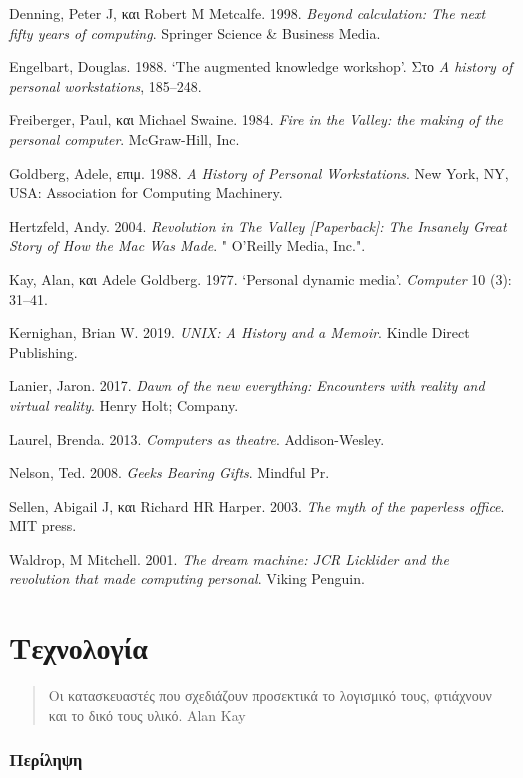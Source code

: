 \documentclass[
]{article}
\begin{document}
Denning, Peter J, και Robert M Metcalfe. 1998. \emph{Beyond calculation:
The next fifty years of computing}. Springer Science \& Business Media.

Engelbart, Douglas. 1988. {`The augmented knowledge workshop'}. Στο
\emph{A history of personal workstations}, 185--248.

Freiberger, Paul, και Michael Swaine. 1984. \emph{Fire in the Valley:
the making of the personal computer}. McGraw-Hill, Inc.

Goldberg, Adele, επιμ. 1988. \emph{A History of Personal Workstations}.
New York, NY, USA: Association for Computing Machinery.

Hertzfeld, Andy. 2004. \emph{Revolution in The Valley
{{[}}Paperback{{]}}: The Insanely Great Story of How the Mac Was Made}.
" O'Reilly Media, Inc.".

Kay, Alan, και Adele Goldberg. 1977. {`Personal dynamic media'}.
\emph{Computer} 10 (3): 31--41.

Kernighan, Brian W. 2019. \emph{UNIX: A History and a Memoir}. Kindle
Direct Publishing.

Lanier, Jaron. 2017. \emph{Dawn of the new everything: Encounters with
reality and virtual reality}. Henry Holt; Company.

Laurel, Brenda. 2013. \emph{Computers as theatre}. Addison-Wesley.

Nelson, Ted. 2008. \emph{Geeks Bearing Gifts}. Mindful Pr.

Sellen, Abigail J, και Richard HR Harper. 2003. \emph{The myth of the
paperless office}. MIT press.

Waldrop, M Mitchell. 2001. \emph{The dream machine: JCR Licklider and
the revolution that made computing personal}. Viking Penguin.

\hypertarget{ux3c4ux3b5ux3c7ux3bdux3bfux3bbux3bfux3b3ux3afux3b1}{%
\section{Τεχνολογία}\label{ux3c4ux3b5ux3c7ux3bdux3bfux3bbux3bfux3b3ux3afux3b1}}

\begin{quote}
Οι κατασκευαστές που σχεδιάζουν προσεκτικά το λογισμικό τους, φτιάχνουν
και το δικό τους υλικό. Alan Kay
\end{quote}

\hypertarget{ux3c0ux3b5ux3c1ux3afux3bbux3b7ux3c8ux3b7}{%
\subsubsection{Περίληψη}\label{ux3c0ux3b5ux3c1ux3afux3bbux3b7ux3c8ux3b7}}
\end{document}
